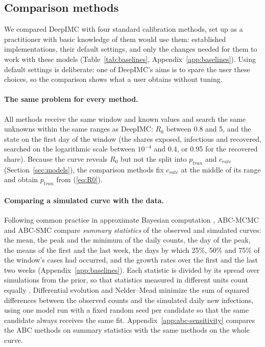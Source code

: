 \documentclass[12pt]{article}
\begin{document}
\subsection{Comparison methods}\label{sec:baselines}

We compared DeepIMC with four standard calibration methods, set up as a practitioner with basic
knowledge of them would use them: established implementations, their default settings, and only
the changes needed for them to work with these models (Table~\ref{tab:baselines},
Appendix~\ref{app:baselines}). Using default settings is deliberate: one of DeepIMC's aims is to
spare the user these choices, so the comparison shows what a user obtains without tuning.

\paragraph{The same problem for every method.} All methods receive the same window and known values
and search the same unknowns within the same ranges as DeepIMC: $R_0$ between 0.8 and 5, and the
state on the first day of the window (the shares exposed, infectious and recovered, searched on the
logarithmic scale between $10^{-4}$ and 0.4, or 0.95 for the recovered share). Because the curve
reveals $R_0$ but not the split into $p_{tran}$ and $c_{rate}$ (Section~\ref{sec:models}), the
comparison methods fix $c_{rate}$ at the middle of its range and obtain $p_{tran}$ from (\ref{eq:R0}).

\paragraph{Comparing a simulated curve with the data.} Following common practice in approximate
Bayesian computation \autocite{beaumont2002approximate}, ABC-MCMC and ABC-SMC compare \emph{summary
statistics} of the observed and simulated curves: the mean, the peak and the minimum of the daily
counts, the day of the peak, the means of the first and the last week, the days by which 25\%, 50\%
and 75\% of the window's cases had occurred, and the growth rates over the first and the last two
weeks (Appendix~\ref{app:baselines}). Each statistic is divided by its spread over simulations from
the prior, so that statistics measured in different units count equally
\autocite{prangle2017adapting}. Differential evolution and Nelder--Mead minimize the sum of squared
differences between the observed counts and the simulated daily new infections, using one model run
with a fixed random seed per candidate so that the same candidate always receives the same fit.
Appendix~\ref{app:abc-sensitivity} compares the ABC methods on summary statistics with the same
methods on the whole curve.
\end{document}
